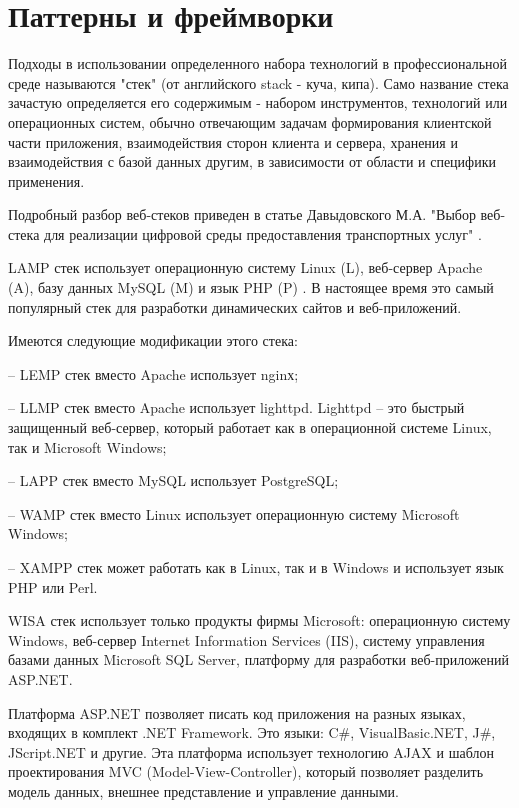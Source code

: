 \section{Паттерны и фреймворки}

Подходы в использовании определенного набора технологий в профессиональной среде называются "стек" (от английского stack - куча, кипа).
Само название стека зачастую определяется его содержимым - набором инструментов, технологий или операционных систем, обычно отвечающим  задачам формирования клиентской части приложения, взаимодействия сторон клиента и сервера, хранения и взаимодействия с базой данных другим, в зависимости от области и специфики применения.


Подробный разбор веб-стеков приведен в статье Давыдовского М.А. "Выбор веб-стека для реализации цифровой среды предоставления транспортных услуг" \cite{davidovsky-vibor}.


LAMP стек \cite{davidovsky-vibor-1} использует операционную систему Linux (L), веб-сервер Apache (A), базу данных MySQL (M) и язык PHP (P) \cite{davidovsky-vibor-php}.
В настоящее время это самый популярный стек для разработки динамических сайтов и веб-приложений.

Имеются следующие модификации этого стека: 

-- LEMP стек вместо Apache использует nginх;

-- LLMP стек вместо Apache использует lighttpd. Lighttpd -- это быстрый защищенный веб-сервер, который работает как в операционной системе Linux, так и Microsoft Windows;

-- LAPP стек вместо MySQL использует PostgreSQL;

-- WAMP стек вместо Linux использует операционную систему Microsoft Windows;

-- XAMPP стек может работать как в Linux, так и в Windows и использует язык PHP или Perl.


WISA стек использует только продукты фирмы Microsoft: операционную систему Windows, веб-сервер Internet Information Services (IIS), систему управления базами данных Microsoft SQL Server, платформу для разработки веб-приложений ASP.NET.

Платформа ASP.NET позволяет писать код приложения на разных языках, входящих в комплект .NET Framework.
Это языки: C\#, VisualBasic.NET, J\#, JScript.NET и другие.
Эта платформа использует технологию AJAX и шаблон проектирования MVC (Model-View-Controller), который позволяет разделить модель данных, внешнее представление и управление данными.

